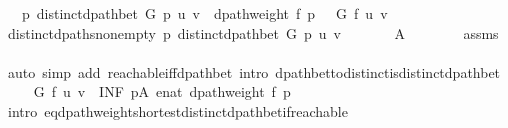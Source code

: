 \begin{isabellebody}
\ \ \ {\isachardoublequoteopen}{\isasymexists}p{\isachardot}{\kern0pt}\ distinct{\isacharunderscore}{\kern0pt}dpath{\isacharunderscore}{\kern0pt}bet\ G\ p\ u\ v\ {\isasymand}\ dpath{\isacharunderscore}{\kern0pt}weight\ f\ p\ {\isacharequal}{\kern0pt}\ {\isasymdelta}\ G\ f\ u\ v{\isachardoublequoteclose}%
\endisataginvisible
{\isafoldinvisible}%
%
\isadeliminvisible
\isanewline
%
\endisadeliminvisible
%
\isadelimproof
%
\endisadelimproof
%
\isatagproof
{}\isamarkupfalse%
\ {\isacharminus}{\kern0pt}\isanewline
\ \ \isamarkupfalse%
\ distinct{\isacharunderscore}{\kern0pt}dpaths{\isacharunderscore}{\kern0pt}non{\isacharunderscore}{\kern0pt}empty{\isacharcolon}{\kern0pt}\ {\isachardoublequoteopen}{\isacharbraceleft}{\kern0pt}p{\isachardot}{\kern0pt}\ distinct{\isacharunderscore}{\kern0pt}dpath{\isacharunderscore}{\kern0pt}bet\ G\ p\ u\ v{\isacharbraceright}{\kern0pt}\ {\isasymnoteq}\ {\isacharbraceleft}{\kern0pt}{\isacharbraceright}{\kern0pt}{\isachardoublequoteclose}\isanewline
\ \ \ \ {\isacharparenleft}{\kern0pt}\ {\isachardoublequoteopen}{\isacharquery}{\kern0pt}A\ {\isasymnoteq}\ {\isacharbraceleft}{\kern0pt}{\isacharbraceright}{\kern0pt}{\isachardoublequoteclose}{\isacharparenright}{\kern0pt}\isanewline
\ \ \ \ \isamarkupfalse%
\ assms\isanewline
\ \ \ \ \isamarkupfalse%
\ {\isacharparenleft}{\kern0pt}auto\ simp\ add{\isacharcolon}{\kern0pt}\ reachable{\isacharunderscore}{\kern0pt}iff{\isacharunderscore}{\kern0pt}dpath{\isacharunderscore}{\kern0pt}bet\ intro{\isacharcolon}{\kern0pt}\ dpath{\isacharunderscore}{\kern0pt}bet{\isacharunderscore}{\kern0pt}to{\isacharunderscore}{\kern0pt}distinct{\isacharunderscore}{\kern0pt}is{\isacharunderscore}{\kern0pt}distinct{\isacharunderscore}{\kern0pt}dpath{\isacharunderscore}{\kern0pt}bet{\isacharparenright}{\kern0pt}\isanewline
\isanewline
\ \ \isamarkupfalse%
\ {\isachardoublequoteopen}{\isasymdelta}\ G\ f\ u\ v\ {\isacharequal}{\kern0pt}\ {\isacharparenleft}{\kern0pt}INF\ p{\isasymin}{\isacharquery}{\kern0pt}A{\isachardot}{\kern0pt}\ enat\ {\isacharparenleft}{\kern0pt}dpath{\isacharunderscore}{\kern0pt}weight\ f\ p{\isacharparenright}{\kern0pt}{\isacharparenright}{\kern0pt}{\isachardoublequoteclose}\isanewline
\ \ \ \ \isamarkupfalse%
\ {\isacharparenleft}{\kern0pt}intro\ {\isasymdelta}{\isacharunderscore}{\kern0pt}eq{\isacharunderscore}{\kern0pt}dpath{\isacharunderscore}{\kern0pt}weight{\isacharunderscore}{\kern0pt}shortest{\isacharunderscore}{\kern0pt}distinct{\isacharunderscore}{\kern0pt}dpath{\isacharunderscore}{\kern0pt}bet{\isacharunderscore}{\kern0pt}if{\isacharunderscore}{\kern0pt}reachable{\isacharparenright}{\kern0pt}\isanewline

\end{isabellebody}
